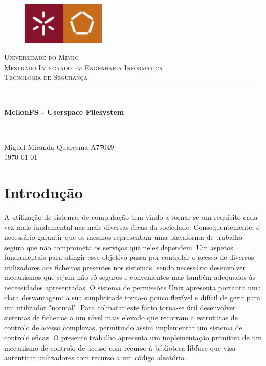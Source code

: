 \documentclass{article}
\newcommand{\titleRule}{
    \rule{\linewidth}{0.5mm} \\ [0.25cm]
}
\begin{document}
\begin{titlepage}
    \center
    \begin{figure}[H]
        \centering
        \includegraphics[width=4cm]{Pictures/UM_EENG.jpg}
    \end{figure}
    \textsc{\LARGE Universidade do Minho} \\ [1.5cm]
    \textsc{\Large Mestrado Integrado em Engenharia Informática} \\ [0.5cm]
    \textsc{\large Tecnologia de Segurança} \\ [0.5cm]

    \titleRule
    {\huge \bfseries MellonFS - Userspace Filesystem}
    \titleRule

    Miguel Miranda Quaresma A77049 \\[0.25cm]

    \today \\[5cm]
    \tableofcontents
\end{titlepage}

\newpage

\section{Introdução}
A utilização de sistemas de computação tem vindo a tornar-se um requisito cada vez mais fundamental nas mais diversas áreas da sociedade. Consequentemente, é 
necessário garantir que os mesmos representam uma plataforma de trabalho segura que não comprometa os serviços que neles dependem. Um aspetos fundamentais para 
atingir esse objetivo passa por controlar o acesso de diversos utilizadores aos ficheiros presentes nos sistemas, sendo necessário desenvolver mecanismos que 
sejam não só seguros e convenientes mas também adequados às necessidades apresentadas.
O sistema de permissões Unix apresenta portanto uma clara desvantagem: a sua simplicicade torna-o pouco flexível e difícil de gerir para um utilizador "normal". 
Para colmatar este facto torna-se útil desenvolver sistemas de ficheiros a um nível mais elevado que recorram a estruturas de controlo de acesso complexas, 
permitindo assim implementar um sistema de controlo eficaz. O presente trabalho apresenta um implementação primitiva de um mecanismo de controlo de acesso com 
recurso à biblioteca libfuse que visa autenticar utilizadores com recurso a um código aleatório.
\end{document}
